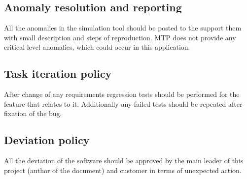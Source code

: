 \subsection{Anomaly resolution and reporting} \label{s:details-of-the-master-test-plan:anomaly-resolution-and-reporting}
	\begin{comment}
		$<$ Describe the method of reporting and resolving anomalies, including the standards for reporting an anomaly, the Anomaly Report distribution list, and the authority and time line for resolving anomalies. This section of the plan defines the anomaly criticality levels. Classification for software anomalies may be found in IEEE Std 1044TM-1993. $>$
	\end{comment}
	All the anomalies in the simulation tool should be posted to the support them with small description and steps of reproduction. \gls{MTP} does not provide any critical level anomalies, which could occur in this application.
\subsection{Task iteration policy} \label{s:details-of-the-master-test-plan:task-iteration-policy}
	\begin{comment}
		$<$ Describe the criteria used to determine the extent to which a testing task is repeated when its input is changed or task procedure is changed (e.g., reexecuting tests after anomalies have been fixed). These criteria may include assessments of change, integrity level, and effects on budget, schedule, and quality. $>$
	\end{comment}
	After change of any requirements regression tests should be performed for the feature that relates to it. Additionally any failed tests should be repeated after fixation of the bug. 
\subsection{Deviation policy} \label{s:details-of-the-master-test-plan:deviation-policy}
	\begin{comment}
		$<$ Describe the procedures and criteria used to deviate from the MTP and level test documentation after they are developed. The information required for deviations includes task identification, rationale, and effect on system/software quality. Identify the authorities responsible for approving deviations. $>$
	\end{comment}
	All the deviation of the software should be approved by the main leader of this project (author of the document) and customer in terms of unexpected action.
